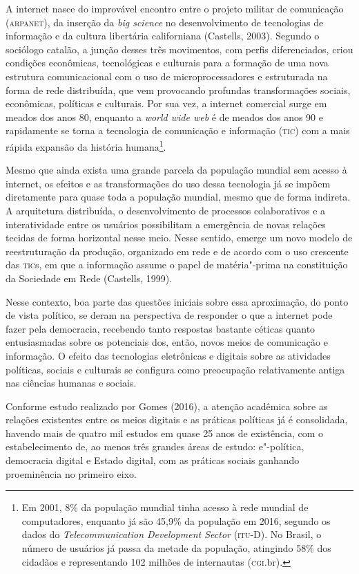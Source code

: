 A internet nasce do improvável encontro entre o projeto militar de
comunicação (\textsc{arpanet}), da inserção da \emph{big science} no
desenvolvimento de tecnologias de informação e da cultura libertária
californiana (Castells, 2003). Segundo o sociólogo catalão, a junção
desses três movimentos, com perfis diferenciados, criou condições
econômicas, tecnológicas e culturais para a formação de uma nova
estrutura comunicacional com o uso de microprocessadores e estruturada
na forma de rede distribuída, que vem provocando profundas
transformações sociais, econômicas, políticas e culturais. Por sua vez,
a internet comercial surge em meados dos anos 80, enquanto a \emph{world
wide web} é de meados dos anos 90 e rapidamente se torna a tecnologia de
comunicação e informação (\textsc{tic}) com a mais rápida expansão da história
humana\footnote{Em 2001, 8\% da população mundial tinha acesso à rede
  mundial de computadores, enquanto já são 45,9\% da população em 2016,
  segundo os dados do \emph{Telecommunication Development Sector}
  (\textsc{itu}-D). No Brasil, o número de usuários já passa da metade da
  população, atingindo 58\% dos cidadãos e representando 102 milhões de
  internautas (\textsc{cgi}.br).}.

Mesmo que ainda exista uma grande parcela da população mundial sem
acesso à internet, os efeitos e as transformações do uso dessa
tecnologia já se impõem diretamente para quase toda a população mundial,
mesmo que de forma indireta. A arquitetura distribuída, o
desenvolvimento de processos colaborativos e a interatividade entre os
usuários possibilitam a emergência de novas relações tecidas de forma
horizontal nesse meio. Nesse sentido, emerge um novo modelo de
reestruturação da produção, organizado em rede e de acordo com o uso
crescente das \textsc{tic}s, em que a informação assume o papel de matéria"-prima
na constituição da Sociedade em Rede (Castells, 1999).

Nesse contexto, boa parte das questões iniciais sobre essa aproximação,
do ponto de vista político, se deram na perspectiva de responder o que a
internet pode fazer pela democracia, recebendo tanto respostas bastante
céticas quanto entusiasmadas sobre os potenciais dos, então, novos meios
de comunicação e informação. O efeito das tecnologias eletrônicas e
digitais sobre as atividades políticas, sociais e culturais se configura
como preocupação relativamente antiga nas ciências humanas e sociais.

Conforme estudo realizado por Gomes (2016), a atenção acadêmica sobre as
relações existentes entre os meios digitais e as práticas políticas já é
consolidada, havendo mais de quatro mil estudos em quase 25 anos de
existência, com o estabelecimento de, ao menos três grandes áreas de
estudo: e"-política, democracia digital e Estado digital, com as práticas
sociais ganhando proeminência no primeiro eixo.

